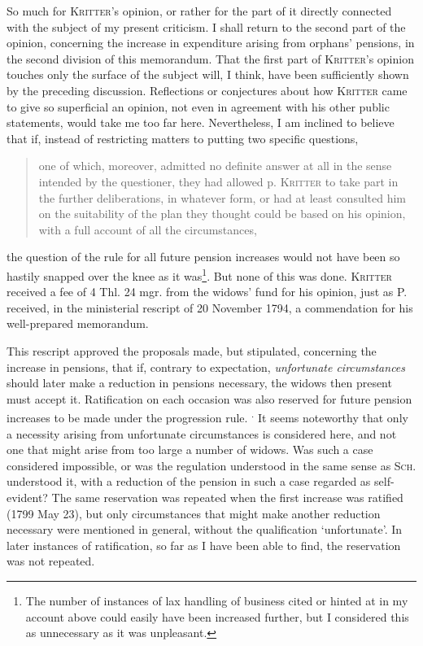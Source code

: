 So much for \textsc{Kritter}'s opinion, or rather for the part of it directly connected with the subject of my present criticism. I shall return to the second part of the opinion, concerning the increase in expenditure arising from orphans' pensions, in the second division of this memorandum. That the first part of \textsc{Kritter}'s opinion touches only the surface of the subject will, I think, have been sufficiently shown by the preceding discussion. Reflections or conjectures about how \textsc{Kritter} came to give so superficial an opinion, not even in agreement with his other public statements, would take me too far here. Nevertheless, I am inclined to believe that if, instead of restricting matters to putting two specific questions,
\begin{quote}
one of which, moreover, admitted no definite answer at all in the sense intended by the questioner, they had allowed p. \textsc{Kritter} to take part in the further deliberations, in whatever form, or had at least consulted him on the suitability of the plan they thought could be based on his opinion, with a full account of all the circumstances,
\end{quote}
\noindent the question of the rule for all future pension increases would not have been so hastily snapped over the knee as it was\footnote{The number of instances of lax handling of business cited or hinted at in my account above could easily have been increased further, but I considered this as unnecessary as it was unpleasant.}. But none of this was done. \textsc{Kritter} received a fee of 4 Thl. 24 mgr. from the widows' fund for his opinion, just as P. received, in the ministerial rescript of 20 November 1794, a commendation for his well-prepared memorandum.

This rescript approved the proposals made, but stipulated, concerning the increase in pensions, that if, contrary to expectation, \textit{unfortunate circumstances} should later make a reduction in pensions necessary, the widows then present must accept it. Ratification on each occasion was also reserved for future pension increases to be made under the progression rule. \textsuperscript{.} It seems noteworthy that only a necessity arising from unfortunate circumstances is considered here, and not one that might arise from too large a number of widows. Was such a case considered impossible, or was the regulation understood in the same sense as \textsc{Sch.} understood it, with a reduction of the pension in such a case regarded as self-evident? The same reservation was repeated when the first increase was ratified (1799 May 23), but only circumstances that might make another reduction necessary were mentioned in general, without the qualification ‘unfortunate’. In later instances of ratification, so far as I have been able to find, the reservation was not repeated.

